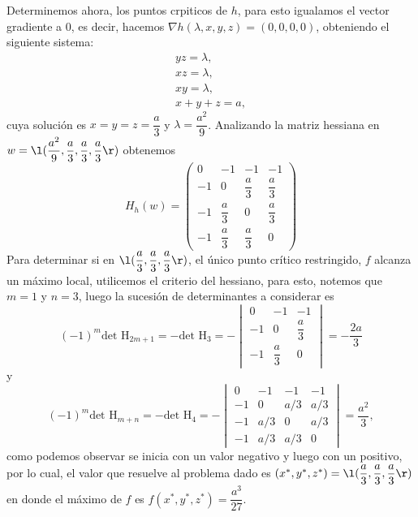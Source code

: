 \documentclass[a4,11pt]{aleph-examen}
\begin{document}
\begin{preguntas}
\begin{respuesta}
\begin{respuesta}
\begin{respuesta}
\begin{enumerate}
\begin{respuesta}
        Determinemos ahora, los puntos crpiticos de $h$, para esto igualamos el vector gradiente a 0, es decir, hacemos $\nabla h(\lambda,x,y,z) = (0,0,0,0)$, obteniendo el siguiente sistema:
        \[
            \begin{array}{cc}
                yz = \lambda,\\
                xz = \lambda,\\
                xy = \lambda,\\
                x+y+z = a,
            \end{array}
        \]
        cuya solución es $x=y=z=\dfrac{a}{3}$ y $\lambda=\dfrac{a^2}{9}$. Analizando la matriz hessiana en $w=\l(\dfrac{a^2}{9},\dfrac{a}{3},\dfrac{a}{3},\dfrac{a}{3}\r)$ obtenemos
        \[
            H_h(w) = 
            \begin{pmatrix}
                0 & -1 & -1 & -1 \\
                -1 & 0 & \dfrac{a}{3} & \dfrac{a}{3} \\
                -1 & \dfrac{a}{3} & 0 & \dfrac{a}{3} \\
                -1 & \dfrac{a}{3} & \dfrac{a}{3} & 0 
            \end{pmatrix}
        \]
        Para determinar si en $\l(\dfrac{a}{3},\dfrac{a}{3},\dfrac{a}{3}\r)$, el único punto crítico restringido, $f$ alcanza un máximo local, utilicemos el criterio del hessiano, para esto, notemos que $m=1$ y $n=3$, luego la sucesión de determinantes a considerar es
        \[
            (-1)^{m}\text{det H}_{2m+1} =  -\text{det H}_{3} = 
            -\begin{vmatrix}
                0 & -1 & -1\\
                -1 & 0 & \dfrac{a}{3}\\
                -1 & \dfrac{a}{3} & 0 
            \end{vmatrix} = -\dfrac{2a}{3}
        \]
        y
        \[
            (-1)^{m}\text{det H}_{m+n} =  -\text{det H}_{4} = 
            -\begin{vmatrix}
                0 & -1 & -1 & -1 \\
                -1 & 0 & a/3 & a/3 \\
                -1 & a/3 & 0 & a/3 \\
                -1 & a/3 & a/3 & 0 
            \end{vmatrix} = \dfrac{a^2}{3},
        \]
        como podemos observar se inicia con un valor negativo y luego con un positivo, por lo cual, el valor que resuelve al problema dado es  $(x^{*},y^{*},z^{*})=\l(\dfrac{a}{3},\dfrac{a}{3},\dfrac{a}{3}\r)$ en donde el máximo de $f$ es $f(x^{*},y^{*},z^{*}) = \dfrac{a^3}{27}$.
\end{respuesta}
    

\end{enumerate}
\end{respuesta}
\end{respuesta}
\end{respuesta}
\end{preguntas}
\end{document}
